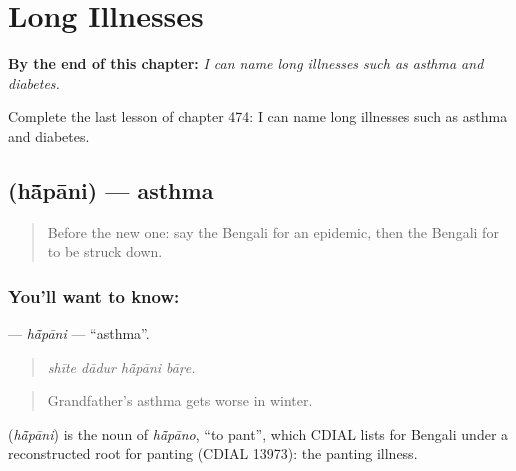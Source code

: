 
\chapter{Long Illnesses}
\label{ch:bn-long-illnesses}

\begin{chapteropening}
\textbf{By the end of this chapter:} \emph{I can name long illnesses such as asthma and diabetes.}

Complete the last lesson of chapter 474: I can name long illnesses such as asthma and diabetes.
\end{chapteropening}

\section[\texorpdfstring{\bn{হাঁপানি} (hā̃pāni)}{হাঁপানি (hā̃pāni)}]{ (hā̃pāni) — asthma}

\label{lesson:BN-C474-hapani}



\begin{quote}
Before the new one: say the Bengali for an epidemic, then the Bengali for to be struck down.
\end{quote}

\subsection*{You'll want to know: }
\textbf{} — \emph{hā̃pāni} — \textquotedblleft{}asthma\textquotedblright{}.

\begin{quote}
   
\end{quote}

\begin{quote}
\emph{shīte dādur hā̃pāni bāṛe.}
\end{quote}

\begin{quote}
Grandfather's asthma gets worse in winter.
\end{quote}

\begin{cousinweb}
\textbf{} (\emph{hā̃pāni}) is the noun of \emph{hā̃pāno}, \textquotedblleft{}to pant\textquotedblright{}, which CDIAL lists for Bengali under a reconstructed root for panting (CDIAL 13973): the panting illness.
\end{cousinweb}

